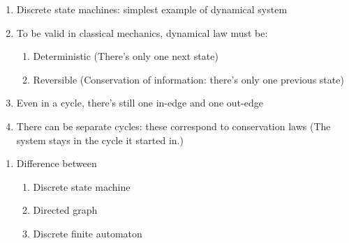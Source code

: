 \begin{enumerate}
\item Discrete state machines: simplest example of dynamical system
\item To be valid in classical mechanics, dynamical law must be:
  \begin{enumerate}
  \item Deterministic (There's only one next state)
  \item Reversible (Conservation of information: there's only one previous state)
  \end{enumerate}
\item Even in a cycle, there's still one in-edge and one out-edge
\item There can be separate cycles: these correspond to conservation laws
  (The system stays in the cycle it started in.)
\end{enumerate}


\begin{enumerate}
\item Difference between
  \begin{enumerate}
  \item Discrete state machine
  \item Directed graph
  \item Discrete finite automaton
  \end{enumerate}
\end{enumerate}